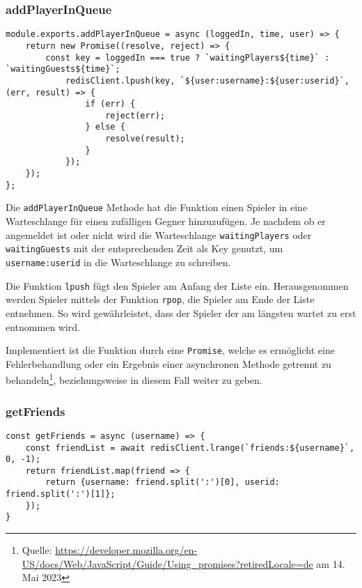 \subsubsection{addPlayerInQueue}

\begin{lstlisting}[style=codeStyle, caption={Methode um einen Spieler in eine Warteschlange hinzuzufügen}, label={lst:addPlayerInQueue}]
module.exports.addPlayerInQueue = async (loggedIn, time, user) => {
    return new Promise((resolve, reject) => {
        const key = loggedIn === true ? `waitingPlayers${time}` : `waitingGuests${time}`;
            redisClient.lpush(key, `${user:username}:${user:userid}`, (err, result) => {
                if (err) {
                    reject(err);
                } else {
                    resolve(result);
                }
            });
    });
};
\end{lstlisting}

Die \verb|addPlayerInQueue| Methode hat die Funktion einen Spieler in eine Warteschlange für einen zufälligen Gegner hinzuzufügen. Je nachdem ob er angemeldet ist oder nicht wird die Warteschlange \verb|waitingPlayers| oder \verb|waitingGuests| mit der entsprechenden Zeit als Key genutzt, um \verb|username:userid| in die Warteschlange zu schreiben.

Die Funktion \verb|lpush| fügt den Spieler am Anfang der Liste ein. Herausgenommen werden Spieler mittels der Funktion \verb|rpop|, die Spieler am Ende der Liste entnehmen. So wird gewährleistet, dass der Spieler der am längsten wartet zu erst entnommen wird.

Implementiert ist die Funktion durch eine \verb|Promise|, welche es ermöglicht eine Fehlerbehandlung oder ein Ergebnis einer asynchronen Methode getrennt zu behandeln\footnote{Quelle: \url{https://developer.mozilla.org/en-US/docs/Web/JavaScript/Guide/Using_promises?retiredLocale=de} am 14. Mai 2023}, beziehungsweise in diesem Fall weiter zu geben. 


\subsubsection{getFriends}
\label{sec:getFriends}
\begin{lstlisting}[style=codeStyle, caption={Methode um Freunde eines Spielers zu erhalten}, label={lst:getFriends}]
const getFriends = async (username) => {
    const friendList = await redisClient.lrange(`friends:${username}`, 0, -1);
    return friendList.map(friend => {
        return {username: friend.split(':')[0], userid: friend.split(':')[1]};
    });
}
\end{lstlisting}

